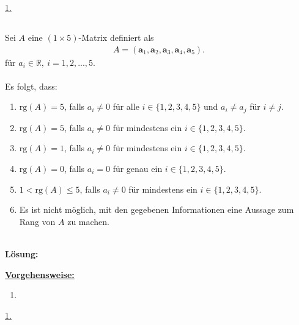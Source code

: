 \underline{1. }\\

\newpage

\subsection*{}
Sei $ A $ eine $ (1 \times 5) $-Matrix definiert als
\begin{align*}
	A
	=
	\left(
	\textbf{a}_1,
	\textbf{a}_2,
	\textbf{a}_3,
	\textbf{a}_4,
	\textbf{a}_5
	\right).
\end{align*}
für $ a_i \in \mathbb{R}, \ i = 1,2,...,5 $.\\
\\
Es folgt, dass:
\renewcommand{\labelenumi}{(\alph{enumi})}
\begin{enumerate}
	\item 
	$ \mathrm{rg}(A) = 5 $, falls $ a_i \neq 0 $ für alle $ i \in \{1,2,3,4,5\} $ und $ a_i \neq a_j $ für $ i \neq j $.
	\item
	$ \mathrm{rg}(A) = 5 $, falls $ a_i \neq 0 $ für mindestens ein $ i \in \{1,2,3,4,5\} $.
	\item
	$ \mathrm{rg}(A) = 1 $, falls $ a_i \neq 0 $ für mindestens ein $ i \in \{1,2,3,4,5\} $.
	\item
	$ \mathrm{rg}(A) = 0 $, falls $ a_i = 0 $ für genau ein $ i \in \{1,2,3,4,5\} $.
	\item
	$1 <  \mathrm{rg}(A)\leq 5 $, falls $ a_i \neq 0 $ für mindestens ein $ i \in \{1,2,3,4,5\} $.
	\item 
	Es ist nicht möglich, mit den gegebenen Informationen eine Aussage zum Rang von $ A $ zu machen.
\end{enumerate}
\ \\
\textbf{Lösung:}
\begin{mdframed}
\underline{\textbf{Vorgehensweise:}}
\renewcommand{\labelenumi}{\theenumi.}
\begin{enumerate}
\item 
\end{enumerate}
\end{mdframed}

\underline{1. }\\

\newpage
